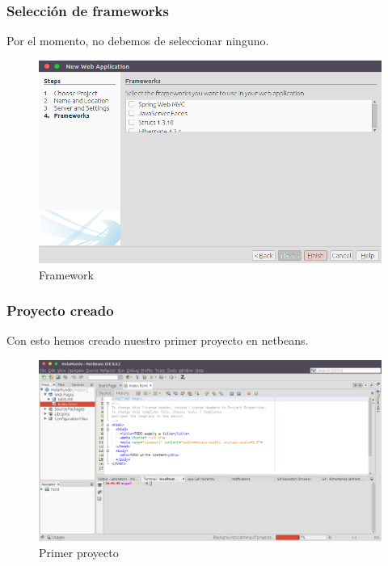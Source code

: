 \documentclass{beamer}
\begin{document}
\begin{frame}
  \frametitle{Selección de frameworks}
  Por el momento, no debemos de seleccionar ninguno.
  \begin{figure}[ht]
    \centering
    \includegraphics[scale=0.25]{figures/frameworks.png}
    \caption{\label{fig:frameworks} Framework}
  \end{figure}

\end{frame}
\begin{frame}
  \frametitle{Proyecto creado}
  Con esto hemos creado nuestro primer proyecto en netbeans.

  \begin{figure}[ht]
    \centering
    \includegraphics[scale=0.20]{figures/Index.png}
    \caption{\label{fig:Proyecto} Primer proyecto}
  \end{figure}

\end{frame}
\end{document}
